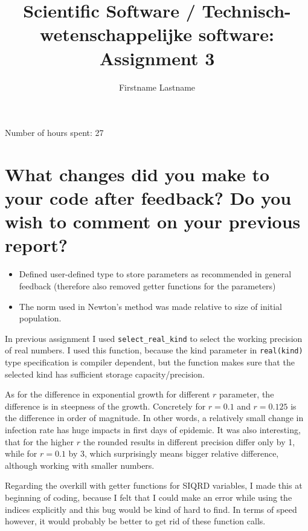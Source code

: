 \documentclass[a4paper]{article}
\title{Scientific Software / Technisch-wetenschappelijke software: Assignment 3}
\author{Firstname Lastname}
\begin{document}
\maketitle

Number of hours spent: 27

\section{What changes did you make to your code after feedback? Do you wish to comment on your previous report?}
\begin{itemize}
	\item Defined user-defined type to store parameters as recommended in general feedback (therefore also removed getter functions for the parameters)
	\item The norm used in Newton's method was made relative to size of initial population.
	
\end{itemize}
In previous assignment I used \texttt{select\_real\_kind} to select the working precision of real numbers. I used this function, because the kind parameter in \texttt{real(kind)} type specification is compiler dependent, but the function makes sure that the selected kind has sufficient storage capacity/precision.

As for the difference in exponential growth for different $ r $ parameter, the difference is in steepness of the growth. Concretely for $ r=0.1 $ and $ r=0.125 $ 
is the difference in order of magnitude. In other words, a relatively small change in infection rate has huge impacts in first days of epidemic. It was also interesting, that for the higher $ r $ the rounded results in different precision differ only by 1, while for $ r=0.1 $ by 3, which surprisingly means bigger relative difference, although working with smaller numbers. 

Regarding the overkill with getter functions for SIQRD variables, I made this at beginning of coding, because I felt that I could make an error while using the indices explicitly and this bug would be kind of hard to find. In terms of speed however, it would probably be better to get rid of these function calls. 
\end{document}
